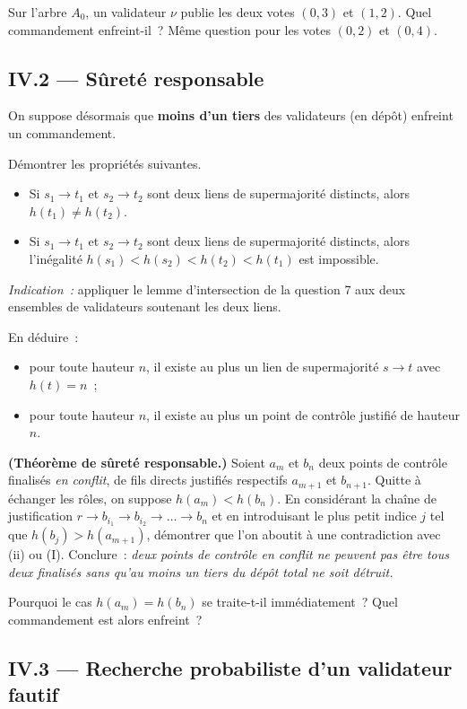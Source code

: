 \documentclass[11pt,a4paper]{article}
\begin{document}
\Q Sur l'arbre $A_0$, un validateur $\nu$ publie les deux votes $(0,3)$ et $(1,2)$. Quel
commandement enfreint-il~? Même question pour les votes $(0,2)$ et $(0,4)$.

\subsection*{IV.2 --- Sûreté responsable}

On suppose désormais que \textbf{moins d'un tiers} des validateurs (en dépôt) enfreint un
commandement.

\Q Démontrer les propriétés suivantes.
\begin{itemize}[leftmargin=2.2em,itemsep=1pt]
\item[(i)] Si $s_1\to t_1$ et $s_2\to t_2$ sont deux liens de supermajorité distincts, alors
$h(t_1)\ne h(t_2)$.
\item[(ii)] Si $s_1\to t_1$ et $s_2\to t_2$ sont deux liens de supermajorité distincts, alors
l'inégalité $h(s_1)<h(s_2)<h(t_2)<h(t_1)$ est impossible.
\end{itemize}
\emph{Indication~:} appliquer le lemme d'intersection de la question 7 aux deux ensembles de
validateurs soutenant les deux liens.

\Q En déduire~:
\begin{itemize}[leftmargin=2.2em,itemsep=1pt]
\item[(iii)] pour toute hauteur $n$, il existe au plus un lien de supermajorité $s\to t$ avec
$h(t)=n$~;
\item[(iv)] pour toute hauteur $n$, il existe au plus un point de contrôle justifié de
hauteur $n$.
\end{itemize}

\Q \textbf{(Théorème de sûreté responsable.)} Soient $a_m$ et $b_n$ deux points de contrôle
finalisés \emph{en conflit}, de fils directs justifiés respectifs $a_{m+1}$ et $b_{n+1}$.
Quitte à échanger les rôles, on suppose $h(a_m)<h(b_n)$. En considérant la chaîne de
justification $r\to b_{i_1}\to b_{i_2}\to\dots\to b_n$ et en introduisant le plus petit
indice $j$ tel que $h(b_j)>h(a_{m+1})$, démontrer que l'on aboutit à une contradiction avec
(ii) ou (I). Conclure~: \emph{deux points de contrôle en conflit ne peuvent pas être tous
deux finalisés sans qu'au moins un tiers du dépôt total ne soit détruit.}

\Q Pourquoi le cas $h(a_m)=h(b_n)$ se traite-t-il immédiatement~? Quel commandement est
alors enfreint~?

\subsection*{IV.3 --- Recherche probabiliste d'un validateur fautif}
\end{document}
